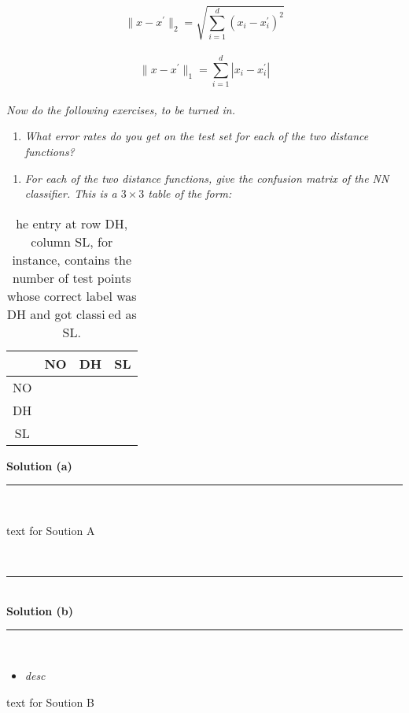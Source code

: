 \documentclass{article}
\begin{document}
$$\|x-x^{\prime}\|_2 = \sqrt{\sum_{i=1}^{d} (x_i - x^{\prime}_i)^2}$$\\

$$\|x-x^{\prime}\|_1 = \sum_{i=1}^{d} |x_i - x^{\prime}_i|$$\\

\textit{Now do the following exercises, to be turned in.}

\begin{enumerate}[label=(a)]
  \item \textit{What error rates do you get on the test set for each of the two distance functions?}
\end{enumerate}
\begin{enumerate}[label=(b)]
  \item \textit{For each of the two distance functions, give the confusion matrix of the NN classifier. This is a
$3 \times 3$ table of the form:}
\end{enumerate}

\begin{table}[h]
\centering
\begin{tabular}{c|c|c|c}
  & NO & DH & SL \\ \hline
NO &   &   &   \\ \hline
DH &   &   &   \\ \hline
SL &   &   &   \\ \hline
\end{tabular}
\caption{he entry at row DH, column SL, for instance, contains the number of test points whose correct
label was DH and got classied as SL.}
\label{tab:empty3x3}
\end{table}


\textbf{Solution (a)}

\noindent\rule{\textwidth}{0.4pt}\\

\parbox{\textwidth}{text for Soution A}\\

\noindent\rule{\textwidth}{0.4pt}\\

\textbf{Solution (b)}

\noindent\rule{\textwidth}{0.4pt}\\

\begin{itemize}
    \item \textit{desc}
\end{itemize}

\parbox{\textwidth}{text for Soution B}\\
\end{document}
